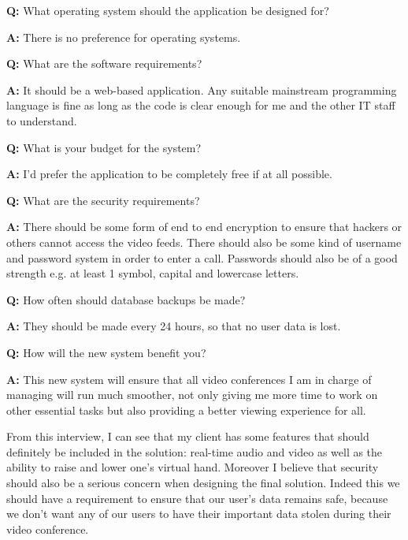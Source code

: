 \begin{tcolorbox}[
  boxrule=0pt, frame empty, colback=lightestgray, arc=0pt,
  breakable, colframe=white
]
  \textbf{Q:} What operating system should the application be
  designed for? \vspace{0.05cm}

  \textbf{A:} There is no preference for operating systems.
  \vspace{0.25cm}

  \textbf{Q:} What are the software requirements?
  \vspace{0.05cm}

  \textbf{A:} It should be a web-based application. Any
  suitable mainstream programming language is fine as long as
  the code is clear enough for me and the other IT staff to
  understand.
  \vspace{0.25cm}

  \textbf{Q:} What is your budget for the system?
  \vspace{0.05cm}

  \textbf{A:} I'd prefer the application to be completely free
  if at all possible. \vspace{0.25cm}

  \textbf{Q:} What are the security requirements?
  \vspace{0.05cm}

  \textbf{A:} There should be some form of end to end
  encryption to ensure that hackers or others cannot access the
  video feeds. There should also be some kind of username and
  password system in order to enter a call. Passwords should
  also be of a good strength e.g. at least 1 symbol, capital
  and lowercase letters.
  \vspace{0.25cm}

  \textbf{Q:} How often should database backups be made?
  \vspace{0.05cm}

  \textbf{A:} They should be made every 24 hours, so that no
  user data is lost.
  \vspace{0.25cm}


  \textbf{Q:} How will the new system benefit you?
  \vspace{0.05cm}

  \textbf{A:} This new system will ensure that all video
  conferences I am in charge of managing will run much
  smoother, not only giving me more time to work on other
  essential tasks but also providing a better viewing
  experience for all.

\end{tcolorbox}

From this interview, I can see that my client has some features
that should definitely be included in the solution: real-time
audio and video as well as the ability to raise and lower one's
virtual hand. Moreover I believe that security should also
be a serious concern when designing the final solution. Indeed
this we should have a requirement to ensure that our user's data
remains safe, because we don't want any of our users
to have their important data stolen during their video
conference. \vspace{0.2cm}

